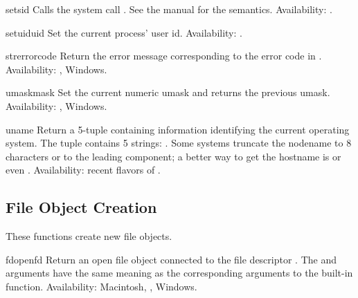 \begin{funcdesc}{setsid}{}
Calls the system call .  See the \UNIX{} manual
for the semantics.
Availability: \UNIX{}.
\end{funcdesc}

\begin{funcdesc}{setuid}{uid}
Set the current process' user id.
Availability: \UNIX{}.
\end{funcdesc}

\begin{funcdesc}{strerror}{code}
Return the error message corresponding to the error code in
.
Availability: \UNIX{}, Windows.
\end{funcdesc}

\begin{funcdesc}{umask}{mask}
Set the current numeric umask and returns the previous umask.
Availability: \UNIX{}, Windows.
\end{funcdesc}

\begin{funcdesc}{uname}{}
Return a 5-tuple containing information identifying the current
operating system.  The tuple contains 5 strings:
.  Some systems truncate the nodename to 8
characters or to the leading component; a better way to get the
hostname is 
or even
.
Availability: recent flavors of \UNIX{}.
\end{funcdesc}



\subsection{File Object Creation \label{os-newstreams}}

These functions create new file objects.


\begin{funcdesc}{fdopen}{fd}
Return an open file object connected to the file descriptor .
The  and  arguments have the same meaning as
the corresponding arguments to the built-in 
function.
Availability: Macintosh, \UNIX{}, Windows.
\end{funcdesc}

